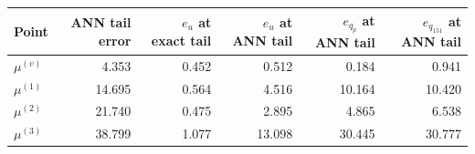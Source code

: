 \begin{tabular}{lrrrrr}
\toprule
Point & ANN tail error & $e_u$ at exact tail & $e_u$ at ANN tail & $e_{q_p}$ at ANN tail & $e_{q_{151}}$ at ANN tail \\
\midrule
$\mu^{(v)}$ & 4.353 & 0.452 & 0.512 & 0.184 & 0.941 \\
$\mu^{(1)}$ & 14.695 & 0.564 & 4.516 & 10.164 & 10.420 \\
$\mu^{(2)}$ & 21.740 & 0.475 & 2.895 & 4.865 & 6.538 \\
$\mu^{(3)}$ & 38.799 & 1.077 & 13.098 & 30.445 & 30.777 \\
\bottomrule
\end{tabular}
